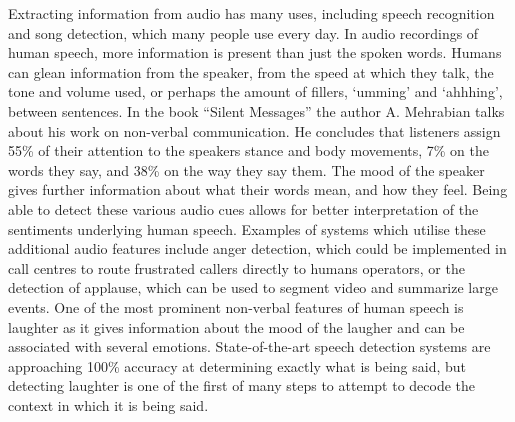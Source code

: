 \documentclass[a4paper,11pt,notitlepage]{article}
\begin{document}
Extracting information from audio has many uses, including speech recognition and song detection, which many people use every day. In audio recordings of human speech, more information is present than just the spoken words. Humans can glean information from the speaker, from the speed at which they talk, the tone and volume used,\cite{dellaert1996recognizing} or perhaps the amount of fillers, `umming' and `ahhhing', between sentences.\cite{brennan1995feeling} In the book ``Silent Messages''\cite{mehrabian1971silent} the author A. Mehrabian talks about his work on non-verbal communication. He concludes that listeners assign 55\% of their attention to the speakers stance and body movements, 7\% on the words they say, and 38\% on the way they say them. The mood of the speaker gives further information about what their words mean, and how they feel. Being able to detect these various audio cues allows for better interpretation of the sentiments underlying human speech. Examples of systems which utilise these additional audio features include anger detection, which could be implemented in call centres to route frustrated callers directly to humans operators,\cite{yacoub2003recognition} or the detection of applause, which can be used to segment video and summarize large events.\cite{cai2003highlight} One of the most prominent non-verbal features of human speech is laughter as it gives information about the mood of the laugher and can be associated with several emotions. State-of-the-art speech detection systems are approaching 100\% accuracy at determining exactly what is being said, but detecting laughter is one of the first of many steps to attempt to decode the context in which it is being said.\\
\\
\end{document}
